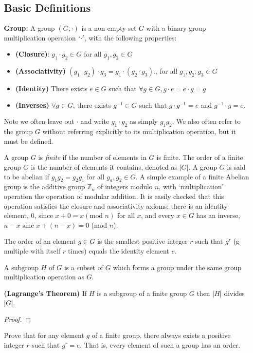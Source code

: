 \subsection{Basic Definitions}
\begin{definition} 
\textbf{Group:} A group $(G,\cdot)$ is a non-empty set $G$ with a binary group multiplication operation $`\cdot'$, with the following properties:
\begin{itemize}
    \item \textbf{(Closure)}: $g_1 \cdot g_2 \in G$ for all $g_1,g_2 \in G$
    \item \textbf{(Associativity)} $(g_1 \cdot g_2) \cdot g_3 = g_1 \cdot (g_2 \cdot g_3)$., for all $g_1,g_2,g_3 \in G$
    \item \textbf{(Identity)} There exists $e\in G$ such that $\forall g\in G, g\cdot e =e\cdot g =g$ 
    \item \textbf{(Inverses)} $\forall g \in G$, there exists $g^{-1} \in G$ such that $g\cdot g^{-1}=e$ and $g^{-1}\cdot g=e$.
\end{itemize}
Note we often leave out $\cdot$ and write $g_1\cdot g_2$ as simply $g_1g_2$. We also often refer to the group $G$ without referring explicitly to its multiplication operation, but it must be defined.
\end{definition}
A group $G$ is \textit{finite} if the number of elements in $G$ is finite. The order of a finite group $G$ is the number of elements it contains, denoted as $|G|$. A group $G$ is said to be abelian if $g_1g_2=g_2g_1$ for all $g_a,g_2 \in G$. A simple example of a finite Abelian group is the additive group $\mathbb{Z}_n$ of integers modulo $n$, with `multiplication' operation the operation of modular addition. It is easily checked that this operation satisfies the closure and associativity axioms; there is an identity element, $0$, since $x+0=x (\text{mod }n)$ for all $x$, and every $x \in G$ has an inverse, $n-x$ sine $x + (n-x) = 0$ (mod $n$).

The order of an element $g \in G$ is the smallest positive integer $r$ such that $g^r$ (g multiple with itself $r$ times) equals the identity element $e$.

A subgroup $H$ of $G$ is a subset of $G$ which forms a group under the same group multiplication operation as $G$.

\begin{theorem}
    \textbf{(Lagrange's Theorem)} If $H$ is a subgroup of a finite group $G$ then $|H|$ divides $|G|$.
\end{theorem}
\begin{proof}
    
\end{proof}
\begin{example}
    Prove that for any element $g$ of a finite group, there always exists a positive integer $r$ such that $g^r=e$. That is, every element of such a group has an order.
\end{example}

